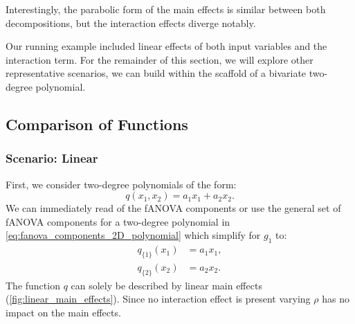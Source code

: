 Interestingly, the parabolic form of the main effects is similar between both decompositions, but the interaction effects diverge notably.\par
Our running example included linear effects of both input variables and the interaction term. For the remainder of this section, we will explore other representative scenarios, we can build within the scaffold of a bivariate two-degree polynomial.

\subsection{Comparison of Functions}
\subsubsection{Scenario: Linear}
First, we consider two-degree polynomials of the form:
$$q(x_1, x_2) = a_1 x_1 + a_2 x_2.$$
We can immediately read of the fANOVA components or use the general set of fANOVA components for a two-degree polynomial in \autoref{eq:fanova_components_2D_polynomial} which simplify for $g_1$ to:
\begin{align*}
    q_{\{1\}}(x_1) &= a_1 x_1, \\
    q_{\{2\}}(x_2) &= a_2 x_2.
\end{align*}
The function $q$ can solely be described by linear main effects (\autoref{fig:linear_main_effects}). Since no interaction effect is present varying $\rho$ has no impact on the main effects.

